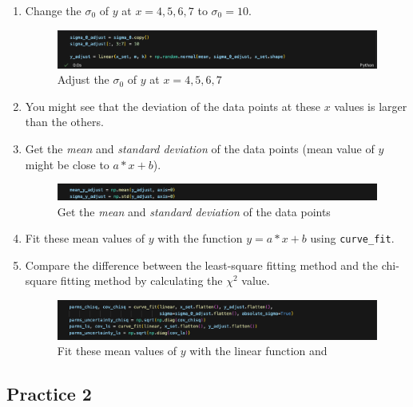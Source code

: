 \documentclass[12pt,a4paper]{article}
\begin{document}
\begin{CJK}{UTF8}{bkai}
\begin{enumerate}
    \clearpage
    \item Change the \(\sigma_0\) of \( y \) at \( x = 4, 5, 6, 7 \) to \(\sigma_0 = 10\).
    \begin{figure}[h]
        \centering
        \includegraphics[width=1\linewidth]{figures/code/code_1_3_2.png}
        \caption{Adjust the $\sigma_0$ of $y$ at  $x = 4, 5, 6, 7 $}
        \label{fig:code_1_3_2}
    \end{figure}
    \item You might see that the deviation of the data points at these \( x \) values is larger than the others.
    \item Get the \emph{mean} and \emph{standard deviation} of the data points (mean value of \( y \) might be close to \( a \ast x + b \)).
    \begin{figure}[h]
        \centering
        \includegraphics[width=1\linewidth]{figures/code/code_1_4.png}
        \caption{Get the \emph{mean} and \emph{standard deviation} of the data points}
        \label{fig:code_1_4}
    \end{figure}
    \item Fit these mean values of \( y \) with the function \( y = a \ast x + b \) using \texttt{curve\_fit}.
    \item Compare the difference between the least-square fitting method and the chi-square fitting method by calculating the \(\chi^2\) value.
    \begin{figure}[h]
        \centering
        \includegraphics[width=1\linewidth]{figures/code/code_1_6.png}
        \caption{Fit these mean values of $y $ with the linear function and }
        \label{fig:code_1_6}
    \end{figure}
\end{enumerate}

\clearpage
\subsection{Practice 2}
\hfill


\end{CJK}
\end{document}
